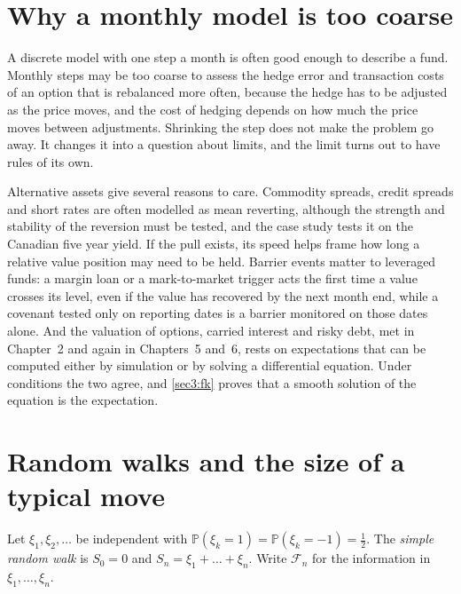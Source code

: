 \begin{chapterrefs}
\section{Why a monthly model is too coarse}
\label{sec3:why}

A discrete model with one step a month is often good enough to describe a fund. Monthly steps may be
too coarse to assess the hedge error and transaction costs of an option that is rebalanced more
often, because the hedge has to be adjusted as the price moves, and the cost of hedging
depends on how much the price moves between adjustments. Shrinking the step does not make the problem
go away. It changes it into a question about limits, and the limit turns out to have rules of its own.

Alternative assets give several reasons to care. Commodity spreads, credit spreads and short rates
are often modelled as mean reverting, although the strength and stability of the reversion must be
tested, and the case study tests it on the Canadian five year yield. If the pull exists, its speed helps frame how long a relative value position may need to be held. Barrier events matter to leveraged funds: a margin loan or a mark-to-market trigger acts the first
time a value crosses its level, even if the value has recovered by the next month end, while a
covenant tested only on reporting dates is a barrier monitored on those dates alone. And the valuation of
options, carried interest and risky debt, met in Chapter~2 and again in Chapters~5 and~6, rests on
expectations that can be computed either by simulation or by solving a differential equation. Under conditions the
two agree, and \cref{sec3:fk} proves that a smooth solution of the equation is the expectation.

\FloatBarrier
\section{Random walks and the size of a typical move}
\label{sec3:rw}

\begin{definition}\label{def3:srw}
Let $\xi_1,\xi_2,\dots$ be independent with $\mathbb P(\xi_k=1)=\mathbb P(\xi_k=-1)=\tfrac12$. The \emph{simple
random walk} is $S_0=0$ and $S_n=\xi_1+\dots+\xi_n$. Write $\mathcal F_n$ for the information in
$\xi_1,\dots,\xi_n$.
\end{definition}


\end{chapterrefs}
